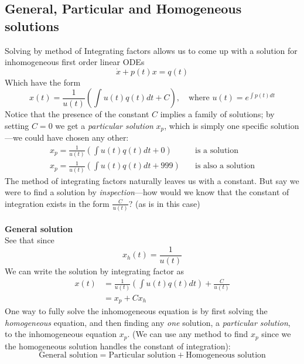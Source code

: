\documentclass{report}
\begin{document}
\subsection{General, Particular and Homogeneous solutions}%
Solving by method of Integrating factors allows us to come up with a solution for inhomogeneous first order linear
ODEs
\begin{equation*}
\dot{x}+p(t)x=q(t)
\end{equation*}
Which have the form
\begin{equation*}
x(t)=\frac{1}{u(t)}\left(\int u(t)q(t)dt+C\right),
\quad\text{where }u(t)=e^{\int p(t)dt}
\end{equation*}
Notice that the presence of the constant $C$ implies a family of solutions; by setting $C=0$ we get a
\textit{particular solution} $x_p$, which is simply one specific solution---we could have chosen any other:
\begin{align*}
x_p=\frac{1}{u(t)}\left(\int u(t)q(t)dt+0\right)\quad&\text{is a solution}\\
x_p=\frac{1}{u(t)}\left(\int u(t)q(t)dt+999\right)\quad&\text{is also a solution}
\end{align*}
The method of integrating factors naturally leaves us with a constant. But say we were to find a solution by 
\textit{inspection}---how would we know that the constant of integration exists in the form $\frac{C}{u(t)}$? (as
is in this case)\\
\vspace{1mm}\\
\textbf{General solution}\\
See that since
\begin{equation*}
x_h(t)=\frac{1}{u(t)}
\end{equation*}
We can write the solution by integrating factor as
\begin{align*}
x(t)&=\frac{1}{u(t)}\left(\int u(t)q(t)dt\right)+\frac{C}{u(t)}\\
&=x_p+Cx_h
\end{align*}
One way to fully solve the inhomogeneous equation is by first solving the \textit{homogeneous} equation, and
then finding any \textit{one} solution, a \textit{particular solution}, to the inhomogeneous equation $x_p$. 
(We can use any method to find $x_p$ since we the homogeneous solution handles the constant of integration):
\begin{equation*}
\text{General solution}=\text{Particular solution}+\text{Homogeneous solution}
\end{equation*}
\end{document}

